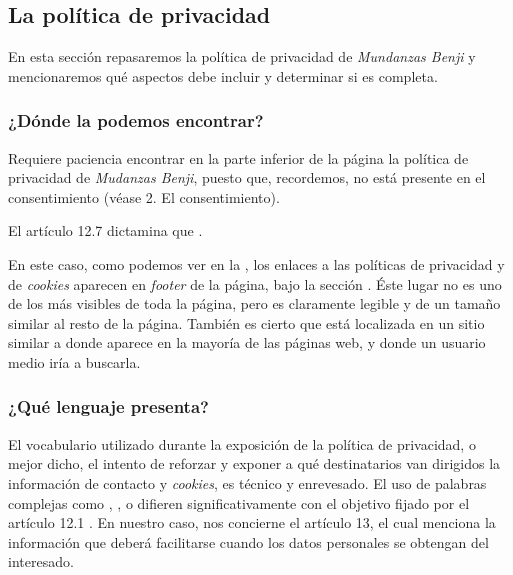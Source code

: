 \subsection{La política de privacidad}\label{subsec:privacidad}
En esta sección repasaremos la política de privacidad de \textit{Mundanzas Benji} y mencionaremos qué aspectos debe incluir y determinar si es completa.

\subsubsection{¿Dónde la podemos encontrar?}
Requiere paciencia encontrar en la parte inferior de la página la política de privacidad de \textit{Mudanzas Benji}, puesto que, recordemos, no está presente en el consentimiento (véase 2. El consentimiento).

El artículo 12.7 dictamina que . 

En este caso, como podemos ver en la , los enlaces a las políticas de privacidad y de \textit{cookies} aparecen en \textit{footer} de la página, bajo la sección . Éste lugar no es uno de los más visibles de toda la página, pero es claramente legible y de un tamaño similar al resto de la página.
También es cierto que está localizada en un sitio similar a donde aparece en la mayoría de las páginas web, y donde un usuario medio iría a buscarla.



\subsubsection{¿Qué lenguaje presenta?}
El vocabulario utilizado durante la exposición de la política de privacidad, o mejor dicho, el intento de reforzar y exponer a qué destinatarios van dirigidos la información de contacto y \textit{cookies}, es técnico y enrevesado. El uso de palabras complejas como , ,  o  difieren significativamente con el objetivo fijado por el artículo 12.1 . En nuestro caso, nos concierne el artículo 13, el cual menciona la información que deberá facilitarse cuando los datos personales se obtengan del interesado.


